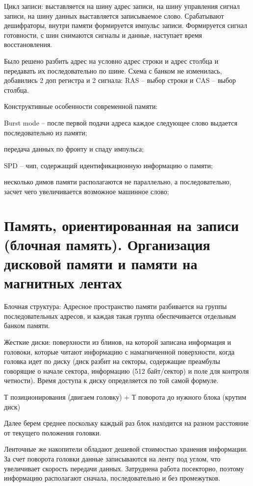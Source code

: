 \documentclass{article}
\begin{document}
Цикл записи: выставляется на шину адрес записи, на шину управления сигнал записи, на шину данных выставляется записываемое слово. 
Срабатывают дешифраторы, внутри памяти формируется импульс записи. 
Формируется сигнал готовности, с шин снимаются сигналы и данные, наступает время восстановления.


Было решено разбить адрес на условно адрес строки и адрес столбца и передавать их последовательно по шине. 
Схема с банком не изменилась, добавились 2 доп регистра и 2 сигнала: RAS – выбор строки и CAS – выбор столбца. 

Конструктивные особенности современной памяти:

Burst mode – после первой подачи адреса каждое следующее слово выдается последовательно из памяти;

передача данных по фронту и спаду импульса;

SPD – чип, содержащий идентификационную информацию о памяти;  

несколько димов памяти располагаются не параллельно, а последовательно, засчет чего увеличивается возможное машинное слово;

\section{Память, ориентированная на записи (блочная память). Организация дисковой памяти и памяти на магнитных лентах}
Блочная структура: Адресное пространство памяти разбивается на группы последовательных адресов, и каждая такая группа обеспечивается отдельным банком памяти.

Жесткие диски:  поверхности из блинов, на которой записана информация и головоки, которые читают информацию с намагниченной поверхности, 
когда головка идет по диску (диск разбит на секторы, содержащие преамбулы говорящие о начале сектора, информацию (512 байт/сектор) и поле для контроля четности). 
Время доступа к диску определяется по той самой формуле.

Т позиционирования (двигаем головку) + Т поворота до нужного блока (крутим диск)


Далее берем среднее поскольку каждый раз блок находится на разном расстояние от текущего положения головки.

Ленточные же накопители обладают дешевой стоимостью хранения информации. За счет поворота головки данные записываются на ленту под углом, что увеличивает скорость передачи данных. 
Затруднена работа посекторно, поэтому информацию располагают сначала, последовательно и без промежутков. 
\end{document}
